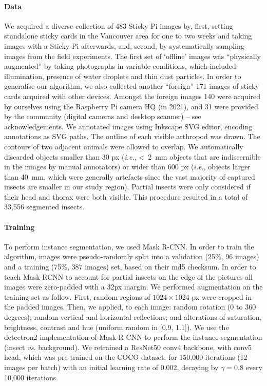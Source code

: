 \documentclass[12pt]{article}
\begin{document}
\begin{linenumbers}
		\paragraph{Data}
		We acquired a diverse collection of 483 Sticky Pi images by, first, setting standalone sticky cards in the Vancouver area for one to two weeks and taking images with a Sticky Pi afterwards, and, second, by systematically sampling images from the field experiments. The first set of ‘offline’ images was “physically augmented” by taking photographs in variable conditions, which included illumination, presence of water droplets and thin dust particles. 
		In order to generalise our algorithm, we also collected another ``foreign'' 171 images of sticky cards acquired with other devices. Amongst the foreign images 140 were acquired by ourselves using the Raspberry Pi camera HQ (in 2021), and 31 were provided by the community (digital cameras and desktop scanner) -- see acknowledgements. 
		We annotated images using Inkscape SVG editor, encoding annotations as SVG paths. The outline of each visible arthropod was drawn. The contours of two adjacent animals were allowed to overlap. We automatically discarded objects smaller than 30 px (\emph{i.e.}, <~2~mm objects that are indiscernible in the images by manual annotators) or wider than 600 px (\emph{i.e.}, objects larger than 40~mm, which were generally artefacts since the vast majority of captured insects are smaller in our study region). Partial insects were only considered if their head and thorax were both visible. This procedure resulted in a total of 
		33,556
		segmented insects.
		
		\paragraph{Training}
		To perform instance segmentation, we used Mask R-CNN\cite{he_mask_2017}. In order to train the algorithm, images were pseudo-randomly split into a validation (25\%, 96 images) and a training (75\%, 387 images) set, based on their md5 checksum.
		In order to teach Mask-RCNN to account for partial insects on the edge of the pictures all images were zero-padded with a 32px margin.
		We performed augmentation on the training set as follow. 
		First, random regions of $1024 \times{} 1024$ px were cropped in the padded images.
		Then, we applied, to each image: random rotation (0 to 360 degrees); random vertical and horizontal reflections; and alterations of saturation, brightness, contrast and hue (uniform random in [0.9, 1.1]). 
		We use the detectron2 implementation \cite{wu_detectron2_2019} of Mask R-CNN to perform the instance segmentation (insect \emph{vs.} background). We retrained a ResNet50 conv4 backbone, with conv5 head, which was pre-trained on the COCO dataset, 
		for 150,000 iterations 
		(12 images per batch) with an initial learning rate of 0.002, decaying by $\gamma=0.8$ every 10,000 iterations.
		

\end{linenumbers}
\end{document}
